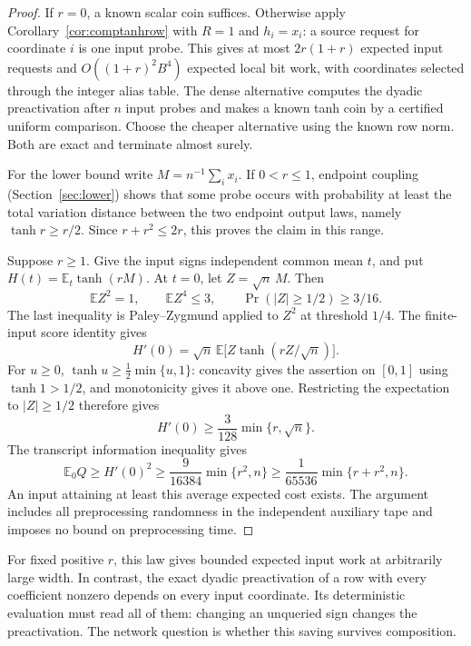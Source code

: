 \begin{proof}
If $r=0$, a known scalar coin suffices. Otherwise apply
Corollary~\ref{cor:comptanhrow} with $R=1$ and $h_i=x_i$: a source
request for coordinate $i$ is one input probe. This gives at most
$2r(1+r)$ expected input requests and $O((1+r)^2B^4)$ expected local
bit work, with coordinates selected through the integer alias table.
The dense alternative computes the dyadic preactivation after $n$
input probes and makes a known tanh coin by a certified uniform
comparison. Choose the cheaper alternative
using the known row norm. Both are exact and terminate almost surely.

For the lower bound write $M=n^{-1}\sum_ix_i$. If $0<r\le1$,
endpoint coupling (Section~\ref{sec:lower}) shows that some probe
occurs with probability at least the total variation distance
between the two endpoint output laws, namely $\tanh r\ge r/2$. Since
$r+r^2\le2r$, this proves the claim in this range.

Suppose $r\ge1$. Give the input signs independent common mean $t$,
and put $H(t)=\mathbb E_t\tanh(rM)$. At $t=0$, let
$Z=\sqrt n\,M$. Then
\[
 \mathbb E Z^2=1,\qquad \mathbb E Z^4\le3,\qquad
 \Pr(|Z|\ge1/2)\ge3/16.
\]
The last inequality is Paley--Zygmund applied to $Z^2$ at threshold
$1/4$. The finite-input score identity gives
\[
 H'(0)=\sqrt n\,\mathbb E\bigl[Z\tanh(rZ/\sqrt n)\bigr].
\]
For $u\ge0$, $\tanh u\ge\frac12\min\{u,1\}$: concavity gives
the assertion on $[0,1]$ using $\tanh1>1/2$, and monotonicity gives
it above one. Restricting the expectation to $|Z|\ge1/2$ therefore
gives
\[
 H'(0)\ge\frac{3}{128}\min\{r,\sqrt n\}.
\]
The transcript information inequality gives
\[
 \mathbb E_0Q\ge H'(0)^2
 \ge\frac9{16384}\min\{r^2,n\}
 \ge\frac1{65536}\min\{r+r^2,n\}.
\]
An input attaining at least this average expected cost exists. The
argument includes all preprocessing randomness in the independent
auxiliary tape and imposes no bound on preprocessing time.
\end{proof}

For fixed positive $r$, this law gives bounded expected input work
at arbitrarily large width. In contrast, the exact dyadic
preactivation of a row with every coefficient nonzero depends on
every input coordinate. Its deterministic evaluation must read all
of them: changing an unqueried sign changes the preactivation.
The network question is whether this saving survives composition.
